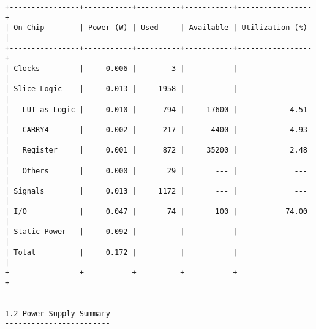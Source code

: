 \begin{Verbatim}[fontsize=\footnotesize,xleftmargin=-2cm]
+----------------+-----------+----------+-----------+-----------------+
| On-Chip        | Power (W) | Used     | Available | Utilization (%) |
+----------------+-----------+----------+-----------+-----------------+
| Clocks         |     0.006 |        3 |       --- |             --- |
| Slice Logic    |     0.013 |     1958 |       --- |             --- |
|   LUT as Logic |     0.010 |      794 |     17600 |            4.51 |
|   CARRY4       |     0.002 |      217 |      4400 |            4.93 |
|   Register     |     0.001 |      872 |     35200 |            2.48 |
|   Others       |     0.000 |       29 |       --- |             --- |
| Signals        |     0.013 |     1172 |       --- |             --- |
| I/O            |     0.047 |       74 |       100 |           74.00 |
| Static Power   |     0.092 |          |           |                 |
| Total          |     0.172 |          |           |                 |
+----------------+-----------+----------+-----------+-----------------+


1.2 Power Supply Summary
------------------------


\end{Verbatim}
